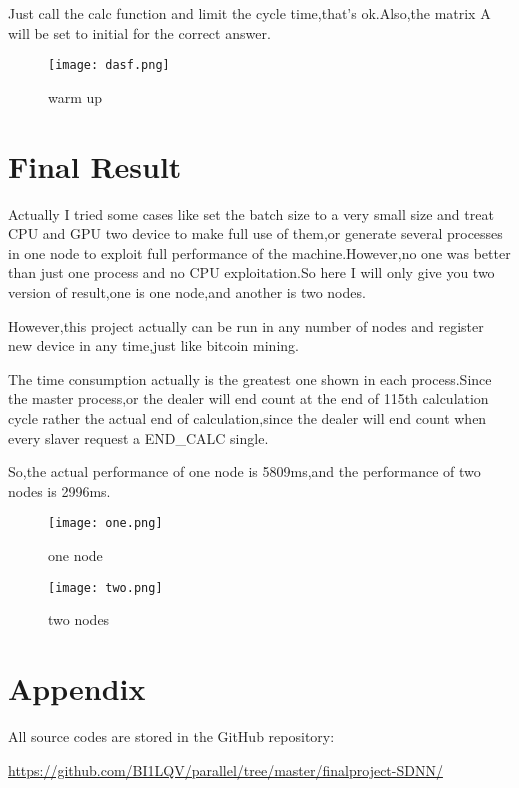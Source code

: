 \documentclass[12pt]{scrartcl} %
\begin{document}
Just call the calc function and limit the cycle time,that's ok.Also,the matrix A will be set to initial for the correct answer.
\begin{figure}[H]
    \centering
    \texttt{[image: dasf.png]}
    \caption{warm up}
\end{figure}
\section{Final Result}
Actually I tried some cases like set the batch size to a very small size and treat CPU and GPU two device to make full use of them,or generate several processes in one node to exploit full performance of the machine.However,no one was better than just one process and no CPU exploitation.So here I will only give you two version of result,one is one node,and another is two nodes.

However,this project actually can be run in any number of nodes and register new device in any time,just like bitcoin mining.

The time consumption actually is the greatest one shown in each process.Since the master process,or the dealer will end count at the end of 115th calculation cycle rather the actual end of calculation,since the dealer will end count when every slaver request a END\_CALC single.

So,the actual performance of one node is 5809ms,and the performance of two nodes is 2996ms.
\begin{figure}[H]
    \centering
    \texttt{[image: one.png]}
    \caption{one node}
    \label{}
\end{figure}
\begin{figure}[H]
    \centering
    \texttt{[image: two.png]}
    \caption{two nodes}
    \label{}
\end{figure}
\section{Appendix}
All source codes are stored in the GitHub repository:


\url{https://github.com/BI1LQV/parallel/tree/master/finalproject-SDNN/}
\end{document}

